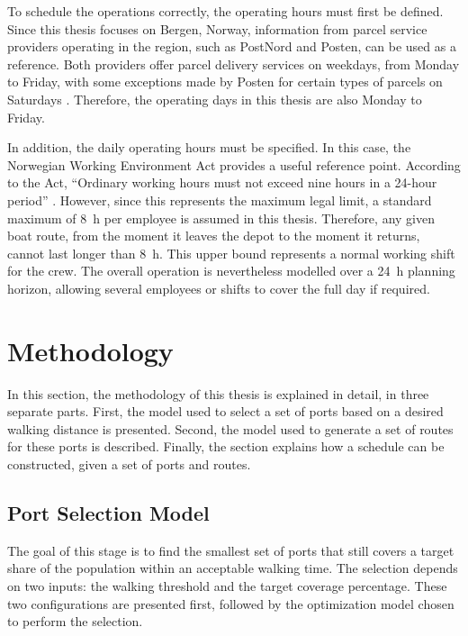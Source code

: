 \documentclass[12pt]{article}
\begin{document}
To schedule the operations correctly, the operating hours must first be defined. Since this thesis focuses on Bergen, Norway, information from parcel service providers operating in the region, such as PostNord and Posten, can be used as a reference. Both providers offer parcel delivery services on weekdays, from Monday to Friday, with some exceptions made by Posten for certain types of parcels on Saturdays \parencite{posten_hours,portnord_hours}. Therefore, the operating days in this thesis are also Monday to Friday.

In addition, the daily operating hours must be specified. In this case, the Norwegian Working Environment Act provides a useful reference point. According to the Act, \enquote{Ordinary working hours must not exceed nine hours in a 24-hour period} \parencite{arbeidsmiljoloven_10_4}. However, since this represents the maximum legal limit, a standard maximum of \qty{8}{\hour} per employee is assumed in this thesis. Therefore, any given boat route, from the moment it leaves the depot to the moment it returns, cannot last longer than \qty{8}{\hour}. This upper bound represents a normal working shift for the crew. The overall operation is nevertheless modelled over a \qty{24}{\hour} planning horizon, allowing several employees or shifts to cover the full day if required.

\section{Methodology}
\label{sec:methodology}

In this section, the methodology of this thesis is explained in detail, in three separate parts. First, the model used to select a set of ports based on a desired walking distance is presented. Second, the model used to generate a set of routes for these ports is described. Finally, the section explains how a schedule can be constructed, given a set of ports and routes.

\subsection{Port Selection Model}
\label{subsec:port-selection-model}

The goal of this stage is to find the smallest set of ports that still covers a target share of the population within an acceptable walking time. The selection depends on two inputs: the walking threshold and the target coverage percentage. These two configurations are presented first, followed by the optimization model chosen to perform the selection.
\end{document}
